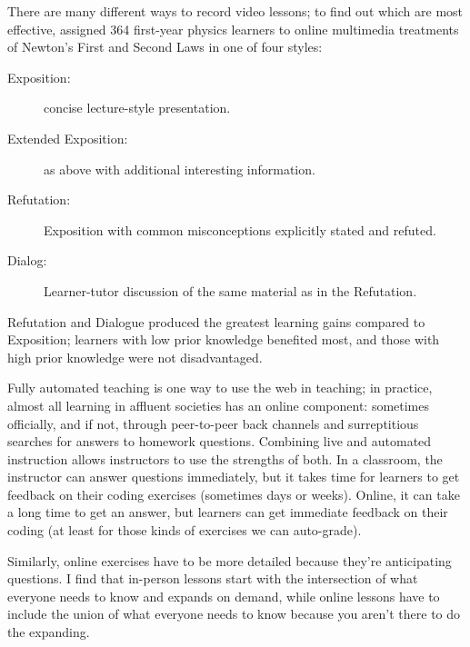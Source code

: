 There are many different ways to record video lessons; to find out which
are most effective, \cite{Mull2007a} assigned 364 first-year physics
learners to online multimedia treatments of Newton's First and Second
Laws in one of four styles:

\begin{description}
\item[Exposition:]
concise lecture-style presentation.
\item[Extended Exposition:]
as above with additional interesting information.
\item[Refutation:]
Exposition with common misconceptions explicitly stated and refuted.
\item[Dialog:]
Learner-tutor discussion of the same material as in the Refutation.
\end{description}

Refutation and Dialogue produced the greatest learning gains compared to
Exposition; learners with low prior knowledge benefited most, and those
with high prior knowledge were not disadvantaged.


Fully automated teaching is one way to use the web in teaching; in
practice, almost all learning in affluent societies has an online
component: sometimes officially, and if not, through peer-to-peer back
channels and surreptitious searches for answers to homework questions.
Combining live and automated instruction allows instructors to use the
strengths of both. In a classroom, the instructor can answer questions
immediately, but it takes time for learners to get feedback on their
coding exercises (sometimes days or weeks). Online, it can take a long
time to get an answer, but learners can get immediate feedback on their
coding (at least for those kinds of exercises we can auto-grade).

Similarly, online exercises have to be more detailed because they're
anticipating questions. I find that in-person lessons start with the
intersection of what everyone needs to know and expands on demand, while
online lessons have to include the union of what everyone needs to know
because you aren't there to do the expanding.

